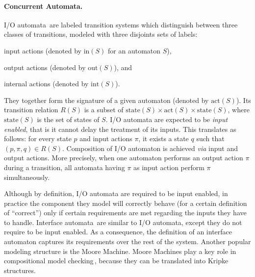 \paragraph{Concurrent Automata.}
%
I/O automata\,\cite{lynch1988ioautomata} are labeled transition systems which
distinguish between three classes of transitions, modeled with three disjoints
sets of labels:
%
\begin{inparaenum}[(1)]
\item input actions (denoted by \( \mathrm{in}(S) \) for an automaton \( S \)),
\item output actions (denoted by \( \mathrm{out}(S) \)), and
\item internal actions (denoted by \( \mathrm{int}(S) \)).
\end{inparaenum}
%
They together form the signature of a given automaton (denoted by
\( \mathrm{act}(S) \)).
%
Its transition relation \( R(S) \) is a subset of
\( \mathrm{state}(S) \times \mathrm{act}(S) \times \mathrm{state}(S) \), where
\( \mathrm{state}(S) \) is the set of states of \( S \).
%
I/O automata are expected to be \emph{input enabled}, that is it cannot delay
the treatment of its inputs.
%
This translates as follows: for every state \( p \) and input actions \( \pi \),
it exists a state \( q \) such that \( (p, \pi, q) \in R(S) \).
%
Composition of I/O automaton is achieved \emph{via} input and output actions.
%
More precisely, when one automaton performs an output action \( \pi \) during a
transition, all automata having \( \pi \) as input action perform \( \pi \)
simultaneously.

Although by definition, I/O automata are required to be input enabled, in
practice the component they model will correctly behave (for a certain
definition of ``correct'') only if certain requirements are met regarding the
inputs they have to handle.
%
Interface automata\,\cite{de2001interfaceautomata} are similar to I/O automata,
except they do not require to be input enabled.
%
As a consequence, the definition of an interface automaton captures its
requirements over the rest of the system.
%
Another popular modeling structure is the Moore Machine.
%
Moore Machines play a key role in compositional model
checking\,\cite{mcmillan1989compositional}, because they can be translated into
Kripke structures.


